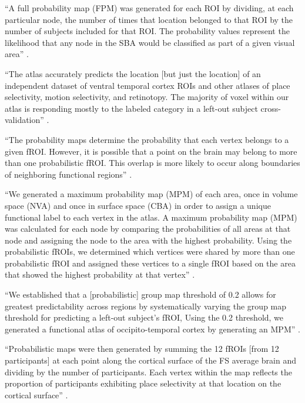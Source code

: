 ``A full probability map (FPM) was generated for each ROI by dividing, at each
particular node, the number of times that location belonged to that ROI by the
number of subjects included for that ROI.
%
The probability values represent the likelihood that any node in the SBA would
be classified as part of a given visual area'' \citep{wang2015probabilistic}.



``The atlas accurately predicts the location [but just the location] of an
independent dataset of ventral temporal cortex ROIs and other atlases of place
selectivity, motion selectivity, and retinotopy.
%
The majority of voxel within our atlas is responding mostly to the labeled
category in a left-out subject cross-validation''
\citep{rosenke2021probabilistic}.

``The probability maps determine the probability that each vertex belongs to a
given fROI.
%
However, it is possible that a point on the brain may belong to more than one
probabilistic fROI.
%
This overlap is more likely to occur along boundaries of neighboring functional
regions'' \citep{rosenke2021probabilistic}.

``We generated a maximum probability map (MPM) of each area, once in volume
space (NVA) and once in surface space (CBA) in order to assign a unique
functional label to each vertex in the atlas.
%
A maximum probability map (MPM) was calculated for each node by comparing the
probabilities of all areas at that node and assigning the node to the area with
the highest probability.
%
Using the probabilistic fROIs, we determined which vertices were shared by more
than one probabilistic fROI and assigned these vertices to a single fROI based
on the area that showed the highest probability at that vertex''
\citep{rosenke2021probabilistic}.

``We established that a [probabilistic] group map threshold of 0.2 allows for
greatest predictability across regions by systematically varying the group map
threshold for predicting a left-out subject's fROI,
%
Using the 0.2 threshold, we generated a functional atlas of occipito-temporal
cortex by generating an MPM'' \citep{rosenke2021probabilistic}.



``Probabilistic maps were then generated by summing the 12 fROIs [from 12
participants] at each point along the cortical surface of the FS average brain
and dividing by the number of participants.
%
Each vertex within the map reflects the proportion of participants exhibiting
place selectivity at that location on the cortical surface''
\citep{weiner2018defining}.

